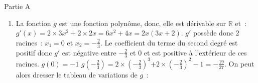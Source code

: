 \begin{corrige}
     \begin{center}
          \begin{h3} Partie A \end{h3}
     \end{center}
     \begin{enumerate}
          \item
          La fonction $ g $ est une fonction polynôme, donc, elle est dérivable sur  $  \mathbb{R}  $ et~:
          \newpar
          $ g'  (x) =2 \times 3x^2+2 \times 2x=6x^2 +4x$\nosp$=2x (3x+2).  $
          \newpar
          $ g'  $ possède donc 2 racines~:  $ x_{ 1 } =0 $ et $ x_{ 2 } =  - \frac{ 2 }{ 3 } . $
          \newpar
          Le coefficient du terme du second degré est positif donc $ g' $ est négative entre $   - \frac{ 2 }{ 3 }  $ et $ 0 $ et est positive à l'extérieur de ces racines.
          \newpar
          $ g (0) = - 1 $
          \newpar
          $ g  \left( -  \frac{ 2 }{ 3 }  \right)  =2 \times  \left(  -  \frac{ 2 }{ 3 }  \right) ^{3}$\nosp$ +2 \times  \left(  -  \frac{ 2 }{ 3 }  \right) ^2  - 1$\nosp$= -  \frac{ 19 }{ 27 } . $
          \newpar
          On peut alors dresser le tableau de variations  de  $ g $~:  \\
          \begin{center}
               \begin{extern}%
\end{extern}
\end{center}
\end{enumerate}
\end{corrige}
